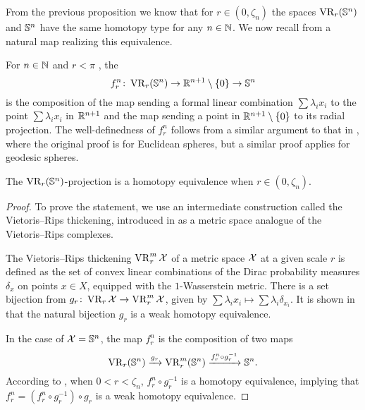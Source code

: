 From the previous proposition we know that for \(r \in (0, \zeta_n)\) the spaces \(\operatorname{VR}_r(\mathbb{S}^n)\) and \(\mathbb{S}^n\) have the same homotopy type for any \(n \in \mathbb{N}\).
We now recall from \cite{adamaszek2020homotopy} a natural map realizing this equivalence.

For \(n \in \mathbb{N}\) and \(r < \pi\) , the 
\[
f_r^n \colon \operatorname{VR}_r(\mathbb{S}^n) \to \mathbb{R}^{n+1} \setminus \{0\} \to \mathbb{S}^n
\]
is the composition of the map sending a formal linear combination $\sum\lambda_i x_i$ to the point \(\sum\lambda_i x_i\) in \(\mathbb{R}^{n+1}\) and the map sending a point in \(\mathbb{R}^{n+1} \setminus \{0\}\) to its radial projection.
The well-definedness of $f_r^n$ follows from a similar argument to that in \cite[Lemma 3]{lovasz1983self}, where the original proof is for Euclidean spheres, but a similar proof applies for geodesic spheres. 

\medskip\proposition
The \(\operatorname{VR}_r(\mathbb{S}^n)\)-projection is a homotopy equivalence when $r \in (0, \zeta_n)$.

\begin{proof}

	To prove the statement, we use an intermediate construction called the Vietoris--Rips thickening, introduced in \cite{adamaszek2018metric} as a metric space analogue of the Vietoris--Rips complexes.

	The Vietoris--Rips thickening $\operatorname{VR}_r^m\mathcal{X}$ of a metric space $\mathcal{X}$ at a given scale $r$ is defined as the set of convex linear combinations of the Dirac probability measures $\delta_{x}$ on points $x \in X$, equipped with the $1$-Wasserstein metric.
	There is a set bijection from $g_r \colon \operatorname{VR}_r\mathcal{X} \to \operatorname{VR}_r^m\mathcal{X}$, given by $\sum \lambda_i x_i \mapsto \sum \lambda_i \delta_{x_i}.$
	It is shown in \cite[Theorem 1]{gillespie2024vietoris} that the natural bijection $g_r$ is a weak homotopy equivalence.

	In the case of $\mathcal{X} = \mathbb{S}^n$, the map $f_r^n$ is the composition of two maps
	\[
	\operatorname{VR}_r(\mathbb{S}^n) \xrightarrow{g_r} \operatorname{VR}_r^m(\mathbb{S}^n) \xrightarrow{f_r^n \circ g_r^{-1}} \mathbb{S}^n.
 	\]
	According to \cite[Proposition 5.3]{adamaszek2018metric}, when $0<r<\zeta_n$, $f_r^n \circ g_r^{-1}$ is a homotopy equivalence, implying that $f_r^n = (f_r^n \circ g_r^{-1}) \circ g_r$ is a weak homotopy equivalence.
\end{proof}

